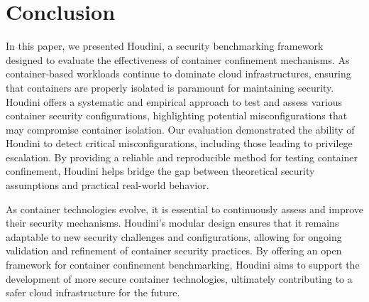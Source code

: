 \section{Conclusion}
\label{sec:conclusion}

In this paper, we presented Houdini, a security benchmarking framework designed to evaluate the effectiveness of container confinement mechanisms. As container-based workloads continue to dominate cloud infrastructures, ensuring that containers are properly isolated is paramount for maintaining security. Houdini offers a systematic and empirical approach to test and assess various container security configurations, highlighting potential misconfigurations that may compromise container isolation. Our evaluation demonstrated the ability of Houdini to detect critical misconfigurations, including those leading to privilege escalation. By providing a reliable and reproducible method for testing container confinement, Houdini helps bridge the gap between theoretical security assumptions and practical real-world behavior.

As container technologies evolve, it is essential to continuously assess and improve their security mechanisms. Houdini's modular design ensures that it remains adaptable to new security challenges and configurations, allowing for ongoing validation and refinement of container security practices. By offering an open framework for container confinement benchmarking, Houdini aims to support the development of more secure container technologies, ultimately contributing to a safer cloud infrastructure for the future.